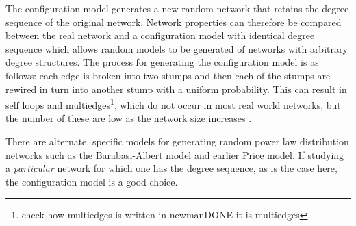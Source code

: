 The configuration model generates a new random network that retains the degree sequence of the original network. Network properties can therefore be compared between the real network and a configuration model with identical degree sequence which allows random models to be generated of networks with arbitrary degree structures. The process for generating the configuration model is as follows: each edge is broken into two stumps and then each of the stumps are rewired in turn into another stump with a uniform probability. This can result in self loops and multiedges\footnote{check how multiedges is written in newmanDONE it is multiedges}, which do not occur in most real world networks, but the number of these are low as the network size increases \cite{newman2018networks}.

There are alternate, specific models for generating random power law distribution networks such as the Barabasi-Albert model\cite{barabasi1999emergence} and earlier Price model\cite{price1965networks}.
If studying a \textit{particular} network for which one has the degree sequence, as is the case here, the configuration model is a good choice\cite{newman2018networks}.


